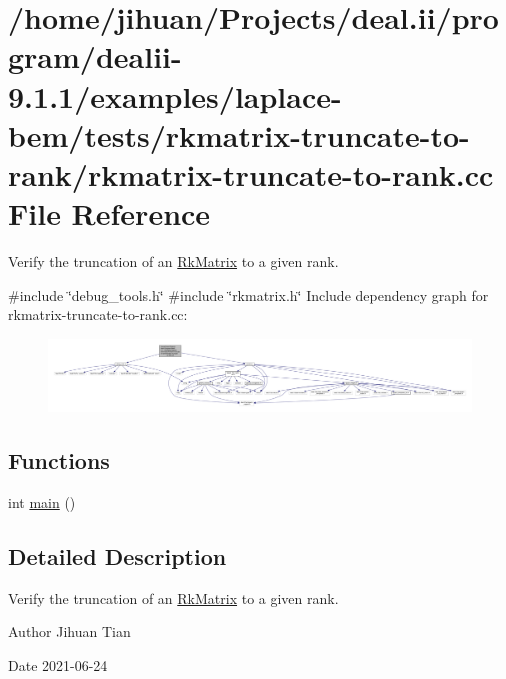 \hypertarget{rkmatrix-truncate-to-rank_8cc}{}\section{/home/jihuan/\+Projects/deal.ii/program/dealii-\/9.1.1/examples/laplace-\/bem/tests/rkmatrix-\/truncate-\/to-\/rank/rkmatrix-\/truncate-\/to-\/rank.cc File Reference}
\label{rkmatrix-truncate-to-rank_8cc}


Verify the truncation of an \hyperlink{classRkMatrix}{Rk\+Matrix} to a given rank.  


{\ttfamily \#include \char`\"{}debug\+\_\+tools.\+h\char`\"{}}\newline
{\ttfamily \#include \char`\"{}rkmatrix.\+h\char`\"{}}\newline
Include dependency graph for rkmatrix-\/truncate-\/to-\/rank.cc\+:
\nopagebreak
\begin{figure}[H]
\begin{center}
\leavevmode
\includegraphics[width=350pt]{rkmatrix-truncate-to-rank_8cc__incl}
\end{center}
\end{figure}
\subsection*{Functions}
\begin{DoxyCompactItemize}
\item 
int \hyperlink{rkmatrix-truncate-to-rank_8cc_ae66f6b31b5ad750f1fe042a706a4e3d4}{main} ()
\end{DoxyCompactItemize}


\subsection{Detailed Description}
Verify the truncation of an \hyperlink{classRkMatrix}{Rk\+Matrix} to a given rank. 

\begin{DoxyAuthor}{Author}
Jihuan Tian 
\end{DoxyAuthor}
\begin{DoxyDate}{Date}
2021-\/06-\/24 
\end{DoxyDate}


